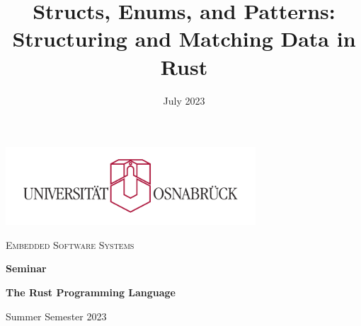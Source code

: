 \title{Structs, Enums, and Patterns: Structuring and Matching Data in Rust}
\author{ }
\date{July 2023}

\makeatletter
\begin{titlepage}
    \begin{center}
        \includegraphics[width=0.7\textwidth]{ressources/img/uos_weiss.pdf}

        \vspace{-5mm}

        {\large \textsc{Embedded Software Systems}}

        \vspace{1cm}

        {\large \textbf{Seminar}}

        {\Large \textbf{The Rust Programming Language}}

        \vspace{5mm}

        {\large {Summer Semester 2023}}

        \vspace{2.5cm}

        { \huge \bfseries \@title \par}

        \vspace{3.5cm}

        {\Large \@author}

        \vspace{5mm}

        {\Large \@date}
    \end{center}
\end{titlepage}
\makeatother
